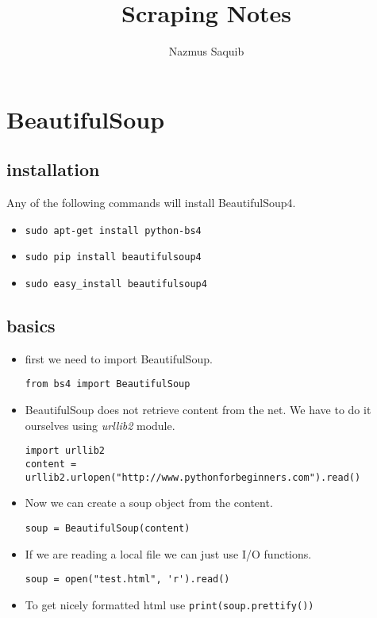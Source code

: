 \documentclass[a4paper, 12pt]{article}
\begin{document}
\title{Scraping Notes}
\author{Nazmus Saquib}

\maketitle
\tableofcontents

\section{BeautifulSoup}
\subsection{installation}
Any of the following commands will install BeautifulSoup4.
\begin{itemize}
\item \verb|sudo apt-get install python-bs4|
\item \verb|sudo pip install beautifulsoup4|
\item \verb|sudo easy_install beautifulsoup4|
\end{itemize}
\subsection{basics}
\begin{itemize}
\item first we need to import BeautifulSoup.
\begin{verbatim}
from bs4 import BeautifulSoup
\end{verbatim}
\item BeautifulSoup does not retrieve content from the net. We have to do it ourselves using \emph{urllib2} module.
\begin{verbatim}
import urllib2
content = urllib2.urlopen("http://www.pythonforbeginners.com").read()
\end{verbatim}
\item Now we can create a soup object from the content.
\begin{verbatim}
soup = BeautifulSoup(content)
\end{verbatim}
\item If we are reading a local file we can just use I/O functions.
\begin{verbatim}
soup = open("test.html", 'r').read()
\end{verbatim}
\item To get nicely formatted html use \verb|print(soup.prettify())|
\end{itemize}
\end{document}
